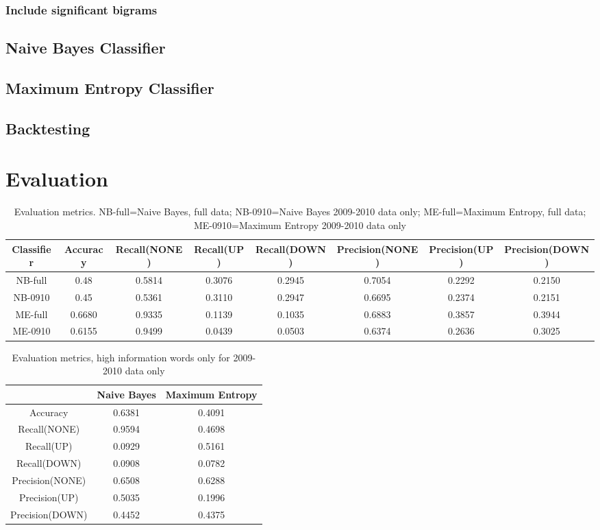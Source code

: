 \documentclass[]{article}
\begin{document}
\subsubsection{Include significant bigrams}
\subsection{Naive Bayes Classifier}
\subsection{Maximum Entropy Classifier}
\subsection{Backtesting}
\section{Evaluation}

\begin{table}[h]
\centering
\begin{tabular}{| c | c | c | c | c | c|c|c|}
\hline
Classifier & Accuracy & Recall(NONE) &Recall(UP)&Recall(DOWN)&Precision(NONE)&Precision(UP)&Precision(DOWN)\\
\hline
NB-full & 0.48 & 0.5814 & 0.3076 & 0.2945 & 0.7054 & 0.2292 & 0.2150\\
\hline
NB-0910 & 0.45 & 0.5361 & 0.3110 & 0.2947 & 0.6695 & 0.2374 & 0.2151\\
\hline
ME-full & 0.6680 & 0.9335 & 0.1139 & 0.1035 & 0.6883 & 0.3857 & 0.3944\\
\hline
ME-0910 & 0.6155 & 0.9499 & 0.0439 & 0.0503 & 0.6374 & 0.2636 & 0.3025 \\
\hline

\end{tabular}
\caption{Evaluation metrics. NB-full=Naive Bayes, full data; NB-0910=Naive Bayes 2009-2010 data only; ME-full=Maximum Entropy, full data; ME-0910=Maximum Entropy 2009-2010 data only}
\end{table}

\begin{table}
\centering
\begin{tabular}{|c|c|c|}
\hline
& Naive Bayes & Maximum Entropy\\
\hline
Accuracy & 0.6381& 0.4091\\
\hline
Recall(NONE) & 0.9594 & 0.4698\\
\hline
Recall(UP) & 0.0929 & 0.5161 \\
\hline
Recall(DOWN) & 0.0908 &  0.0782 \\
\hline
Precision(NONE) & 0.6508 & 0.6288 \\
\hline
Precision(UP) & 0.5035  & 0.1996 \\
\hline
Precision(DOWN) & 0.4452 & 0.4375 \\
\hline

\end{tabular}
\caption{Evaluation metrics, high information words only for 2009-2010 data only}
\end{table}
\end{document}
